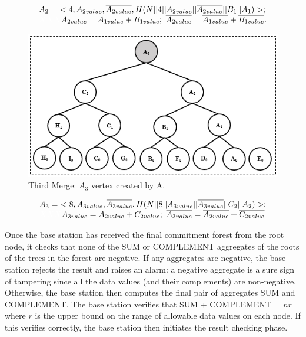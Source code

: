 		\begin{equation*}
			\begin{array}{l}
				A_{2} =\ <4, A_{2value}, \overline{A_{2value}}, H(N || 4 || A_{2value} || \overline{A_{2value}} || B_{1} ||A_{1}) >;\\
				\textcolor{white}{XXX} A_{2value} = A_{1value} + B_{1value};\ \overline{A_{2value}} = \overline{A_{1value}} + \overline{B_{1value}} .
			\end{array}
		\end{equation*}
		\begin{figure}[h!]
			\centering
			\includegraphics{images/commitment-tree-example-4-shia.png}
			\caption{Third Merge: $A_{3}$ vertex created by A.}
			\label{fig:commitment-tree-example-4-shia}
		\end{figure}
		\begin{equation*}
			\begin{array}{l}
				A_{3} =\ <8, A_{3value}, \overline{A_{3value}}, H(N || 8 || A_{3value} || \overline{A_{3value}} || C_{2} ||A_{2}) >;\\
				\textcolor{white}{XXX} A_{3value} = A_{2value} + C_{2value};\ \overline{A_{3value}} = \overline{A_{2value}} + \overline{C_{2value}}
			\end{array}
		\end{equation*}
		
		Once the base station has received the final commitment forest from the root node, it checks that none of the SUM or COMPLEMENT aggregates of the roots of the trees in the forest are negative. 
		If any aggregates are negative, the base station rejects the result and raises an alarm: a negative aggregate is a sure sign of tampering since all the data values (and their complements) are non-negative. 
		Otherwise, the base station then computes the final pair of aggregates SUM and COMPLEMENT. 
		The base station verifies that SUM + COMPLEMENT = $nr$ where $r$ is the upper bound on the range of allowable data values on each node. 
		If this verifies correctly, the base station then initiates the result checking phase.

